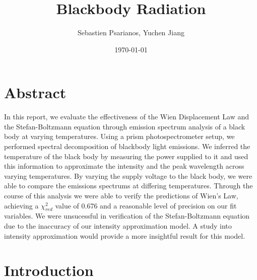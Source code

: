 \documentclass[
	letterpaper
	12pt
]{template}
\title{Blackbody Radiation}
\author{Sebastien Psarianos, Yuchen Jiang}
\date{\today}
\begin{document}
\maketitle
\section{Abstract}
In this report, we evaluate the effectiveness of the Wien Displacement Law and the Stefan-Boltzmann equation through emission spectrum analysis of a black body at varying temperatures. Using a prism photospectrometer setup, we performed spectral decomposition of blackbody light emissions. We inferred the temperature of the black body by measuring the power supplied to it and used this information to approximate the intensity and the peak wavelength across varying temperatures. By varying the supply voltage to the black body, we were able to compare the emissions spectrums at differing temperatures. Through the course of this analysis we were able to verify the predictions of Wien's Law, achieving a $\chi_{red}^2$ value of 0.676 and a reasonable level of precision on our fit variables. We were unsucessful in verification of the Stefan-Boltzmann equation due to the inaccuracy of our intensity approximation model. A study into intensity approximation would provide a more insightful result for this model.



\section{Introduction}
\end{document}
